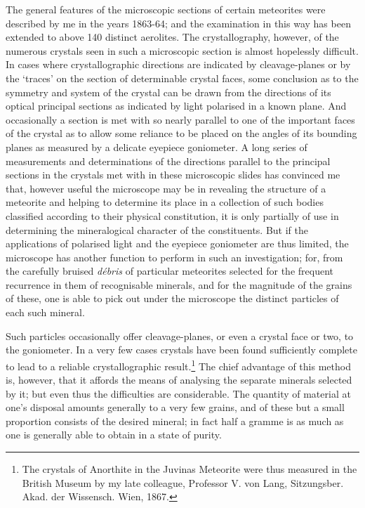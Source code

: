 \documentclass[a4paper, 12pt, oneside]{article}
\begin{document}
The general features of the microscopic sections of certain meteorites were described by me in the years 1863-64; and the examination in this way has been extended to above 140 distinct aerolites. The crystallography, however, of the numerous crystals seen in such a microscopic section is almost hopelessly difficult. In cases where crystallographic directions are indicated by cleavage-planes or by the `traces' on the section of determinable crystal faces, some conclusion as to the symmetry and system of the crystal can be drawn from the directions of its optical principal sections as indicated by light polarised in a known plane. And occasionally a section is met with so nearly parallel to one of the important faces of the crystal as to allow some reliance to be placed on the angles of its bounding planes as measured by a delicate eyepiece goniometer. A long series of measurements and determinations of the directions parallel to the principal sections in the crystals met with in these microscopic slides has convinced me that, however useful the microscope may be in revealing the structure of a meteorite and helping to determine its place in a collection of such bodies classified according to their physical constitution, it is only partially of use in determining the mineralogical character of the constituents. But if the applications of polarised light and the eyepiece goniometer are thus limited, the microscope has another function to perform in such an investigation; for, from the carefully bruised \emph{débris} of particular meteorites selected for the frequent recurrence in them of recognisable minerals, and for the magnitude of the grains of these, one is able to pick out under the microscope the distinct particles of each such mineral.

Such particles occasionally offer cleavage-planes, or even a crystal face or two, to the goniometer. In a very few cases crystals have been found sufficiently complete to lead to a reliable crystallographic result.\footnote{The crystals of Anorthite in the Juvinas Meteorite were thus measured in the British Museum by my late colleague, Professor V. von Lang, Sitzungsber. Akad. der Wissensch. Wien, 1867.} The chief advantage of this method is, however, that it affords the means of analysing the separate minerals selected by it; but even thus the difficulties are considerable. The quantity of material at one's disposal amounts generally to a very few grains, and of these but a small proportion consists of the desired mineral; in fact half a gramme is as much as one is generally able to obtain in a state of purity.
\end{document}
